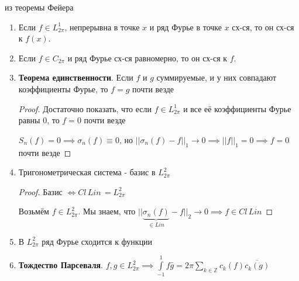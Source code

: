 \begin{consequence}
    из теоремы Фейера
    \begin{enumerate}
        \item {

            Если $f \in L_{2\pi}^1$, непрерывна в точке $x$ и ряд Фурье в точке $x$ сх-ся, то он сх-ся к $f(x)$.
        }
        \item {
            
            Если $f \in C_{2\pi}$ и ряд Фурье сх-ся равномерно, то он сх-ся к $f$.

            
        }
        \item {
            \textbf{Теорема единственности}. Если $f$ и $g$ суммируемые, и у них совпадают коэффициенты Фурье, то $f = g$ почти везде

            \begin{proof}
                Достаточно показать, что если $f \in L_{2\pi}^1$ и все её коэффициенты Фурье равны 0, то $f = 0$ почти везде

                $S_n (f) = 0 \implies \sigma_n (f) \equiv 0$, но $|| \sigma_n (f) - f ||_1 \rightarrow 0 \implies ||f||_1 = 0 \implies f = 0$ почти везде
            \end{proof}
        }
        \item {
            Тригонометрическая система - базис в $L_{2\pi}^2$

            \begin{proof}
                Базис $\Leftrightarrow Cl \, Lin \, = L_{2\pi}^2$

                Возьмём $f \in L_{2\pi}^2$. Мы знаем, что $|| \underbrace{\sigma_n (f)}_{\in Lin} - f ||_2 \rightarrow 0 \implies f \in Cl \, Lin $
            \end{proof}
        }
        \item {
            В $L_{2\pi}^2$ ряд Фурье сходится к функции
        }
        \item {
            \textbf{Тождество Парсеваля}. $f, g \in L_{2\pi}^2 \implies \int\limits_{-1}^1 f \bar{g} = 2\pi \sum\limits_{k \in \mathbb{Z}} c_k (f) \overline{c_k (g)}$
        }
    \end{enumerate}
\end{consequence}

